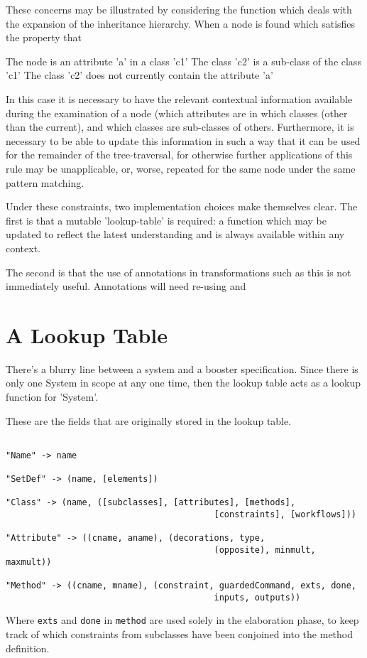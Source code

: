 These concerns may be illustrated by considering the function which
deals with the expansion of the inheritance hierarchy.  When a node is
found which satisfies the property that

The node is an attribute 'a' in a class 'c1'
The class 'c2' is a sub-class of the class 'c1'
The class 'c2' does not currently contain the attribute 'a'

In this case it is necessary to have the relevant contextual
information available during the examination of a node (which
attributes are in which classes (other than the current), and which
classes are sub-classes of others.  Furthermore, it is necessary to be
able to update this information in such a way that it can be used for
the remainder of the tree-traversal, for otherwise further
applications of this rule may be unapplicable, or, worse, repeated for
the same node under the same pattern matching.

Under these constraints, two implementation choices make themselves
clear.  The first is that a mutable 'lookup-table' is required: a
function which may be updated to reflect the latest understanding and
is always available within any context.

The second is that the use of annotations in transformations such as
this is not immediately useful.  Annotations will need re-using and  
 




\section{A Lookup Table}

There's a blurry line between a system and a booster specification.
Since there is only one System in scope at any one time, then the
lookup table acts as a lookup function for 'System'.

These are the fields that are originally stored in the lookup table.

\begin{verbatim}

"Name" -> name

"SetDef" -> (name, [elements])

"Class" -> (name, ([subclasses], [attributes], [methods], 
                                         [constraints], [workflows]))

"Attribute" -> ((cname, aname), (decorations, type, 
                                         (opposite), minmult, maxmult)) 

"Method" -> ((cname, mname), (constraint, guardedCommand, exts, done, 
                                         inputs, outputs))

\end{verbatim}

Where \verb|exts| and \verb|done| in \verb|method| are used solely in the elaboration
phase, to keep track of which constraints from subclasses have been
conjoined into the method definition.
